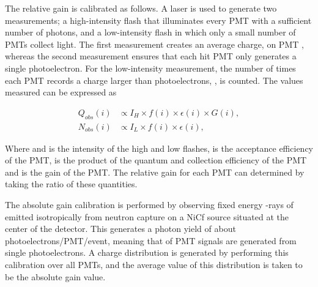 The relative gain is calibrated as follows. A laser is used to generate two measurements; a high-intensity flash that illuminates every PMT with a sufficient number of photons, and a low-intensity flash in which only a small number of PMTs collect light. The first measurement creates an average charge,  on PMT , whereas the second measurement ensures that each hit PMT only generates a single photoelectron. For the low-intensity measurement, the number of times each PMT records a charge larger than  photoelectrons, , is counted. The values measured can be expressed as

\begin{equation}
  \label{eq:T2KSKExp_RelativeGainCalib}
  \begin{split}
    Q_{obs}(i) &\propto I_{H} \times f(i) \times \epsilon(i) \times G(i), \\
    N_{obs}(i) &\propto I_{L} \times f(i) \times \epsilon(i),
  \end{split}
\end{equation}

Where  and  is the intensity of the high and low flashes,  is the acceptance efficiency of the  PMT,  is the product of the quantum and collection efficiency of the  PMT and  is the gain of the 	PMT. The relative gain for each PMT can determined by taking the ratio of these quantities.

The absolute gain calibration is performed by observing fixed energy \quickmath{\gamma}-rays of  emitted isotropically from neutron capture on a NiCf source situated at the center of the detector. This generates a photon yield of about  photoelectrons/PMT/event, meaning that  of PMT signals are generated from single photoelectrons. A charge distribution is generated by performing this calibration over all PMTs, and the average value of this distribution is taken to be the absolute gain value.

